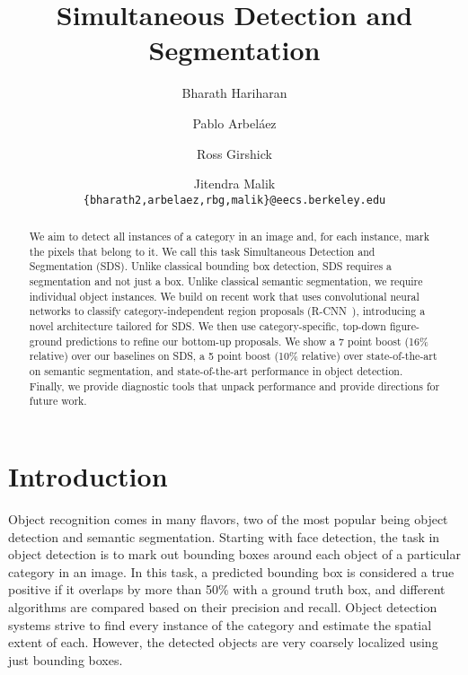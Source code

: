 \documentclass[runningheads]{llncs}
\begin{document}
\pagestyle{headings}
\mainmatter
\title{Simultaneous Detection and Segmentation} 



\author{Bharath Hariharan \and Pablo Arbel\'{a}ez  \and Ross Girshick  \and Jitendra Malik\\
\texttt{\small \{bharath2,arbelaez,rbg,malik\}@eecs.berkeley.edu}}


\maketitle

\begin{abstract}
We aim to detect all instances of a category in an image and, for each instance, mark the pixels that belong to it. We call this task Simultaneous Detection and Segmentation (SDS). Unlike classical bounding box detection, SDS requires a segmentation and not just a box. Unlike classical semantic segmentation, we require individual object instances. We build on recent work that uses convolutional neural networks to classify category-independent region proposals (R-CNN~\cite{GirshickCVPR14}), introducing a novel architecture tailored for SDS. We then use category-specific, top-down figure-ground predictions to refine our bottom-up proposals. We show a 7 point boost (16\% relative) over our baselines on SDS, a 5 point boost (10\% relative) over state-of-the-art on semantic segmentation, and state-of-the-art performance in object detection. Finally, we provide diagnostic tools that unpack performance and provide directions for future work.

\end{abstract}


\section{Introduction}


Object recognition comes in many flavors, two of the most popular being object detection and semantic segmentation. Starting with face detection, the task in object detection is to mark out bounding boxes around each object of a particular category in an image. In this task, a predicted bounding box is considered a true positive if it overlaps by more than 50\% with a ground truth box, and different algorithms are compared based on their precision and recall. Object detection systems strive to find every instance of the category and estimate the spatial extent of each.  However, the detected objects are very coarsely localized using just bounding boxes.
\end{document}
